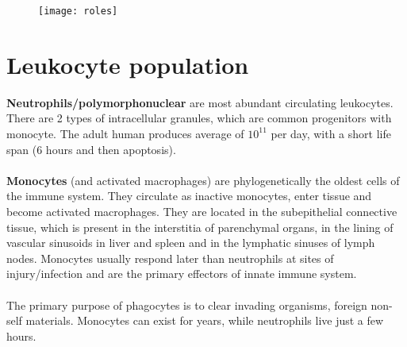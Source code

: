 \begin{figure}[ht]
\texttt{[image: roles]}
\caption{\label{fig:roles}}
\end{figure}

\section{Leukocyte population}

\textbf{Neutrophils/polymorphonuclear} are most abundant circulating leukocytes. 
There are 2 types of intracellular granules, which are common progenitors with monocyte. 
The adult human produces average of $10^11$ per day, with a short life span (6 hours and then apoptosis).
\\
\\
\noindent
\textbf{Monocytes} (and activated macrophages) are phylogenetically the oldest cells of the immune system. 
They circulate as inactive monocytes, enter tissue and become activated macrophages.
They are located in the subepithelial connective tissue, which is present in the interstitia of parenchymal organs, in the lining of vascular sinusoids in liver and spleen and in the lymphatic sinuses of lymph nodes.
Monocytes usually respond later than neutrophils at sites of injury/infection and are the primary effectors of innate immune system.
\\
\\
\noindent
The primary purpose of phagocytes is to clear invading organisms, foreign non-self materials. 
Monocytes can exist for years, while neutrophils live just a few hours.

